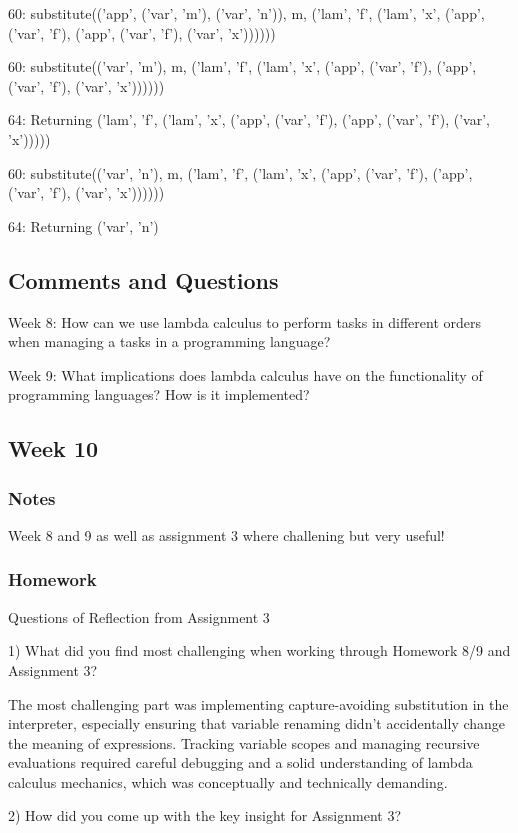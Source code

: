 \documentclass{article}
\theoremstyle{theorem}
\theoremstyle{definition}
\theoremstyle{remark}
\begin{document}
60: substitute(('app', ('var', 'm'), ('var', 'n')), m, ('lam', 'f', ('lam', 'x', ('app', ('var', 'f'), ('app', ('var', 'f'), ('var', 'x'))))))

60: substitute(('var', 'm'), m, ('lam', 'f', ('lam', 'x', ('app', ('var', 'f'), ('app', ('var', 'f'), ('var', 'x'))))))

64: Returning ('lam', 'f', ('lam', 'x', ('app', ('var', 'f'), ('app', ('var', 'f'), ('var', 'x')))))

60: substitute(('var', 'n'), m, ('lam', 'f', ('lam', 'x', ('app', ('var', 'f'), ('app', ('var', 'f'), ('var', 'x'))))))

64: Returning ('var', 'n')

\subsection*{Comments and Questions}
Week 8: How can we use lambda calculus to perform tasks in different orders when managing a tasks in a programming language?

Week 9: What implications does lambda calculus have on the functionality of programming languages? How is it implemented?


\subsection{Week 10}

\subsubsection*{Notes}
Week 8 and 9 as well as assignment 3 where challening but very useful!

\subsubsection*{Homework}
Questions of Reflection from Assignment 3

1) What did you find most challenging when working through Homework 8/9 and Assignment 3?

The most challenging part was implementing capture-avoiding substitution in the interpreter, especially ensuring that variable renaming didn’t accidentally change the meaning of expressions. Tracking variable scopes and managing recursive evaluations required careful debugging and a solid understanding of lambda calculus mechanics, which was conceptually and technically demanding.

2) How did you come up with the key insight for Assignment 3?
\end{document}
